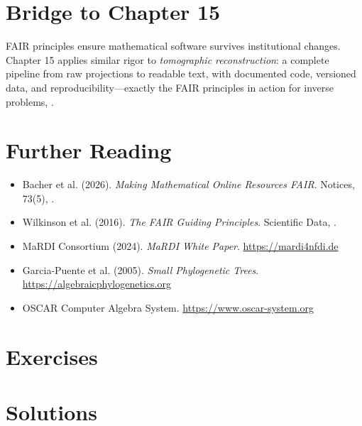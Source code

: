 \section{Bridge to Chapter 15}
\label{sec:fair:bridge}

FAIR principles ensure mathematical software survives institutional changes. Chapter 15 applies similar rigor to \emph{tomographic reconstruction}: a complete pipeline from raw projections to readable text, with documented code, versioned data, and reproducibility---exactly the FAIR principles in action for inverse problems, \cite{bacher2026fair}.

\section{Further Reading}
\label{sec:fair:refs}

\begin{itemize}
    \item Bacher et al. (2026). \textit{Making Mathematical Online Resources FAIR}. Notices, 73(5), \cite{bacher2026fair}.
    \item Wilkinson et al. (2016). \textit{The FAIR Guiding Principles}. Scientific Data, \cite{bacher2026fair}.
    \item MaRDI Consortium (2024). \textit{MaRDI White Paper}. \url{https://mardi4nfdi.de}
    \item Garcia-Puente et al. (2005). \textit{Small Phylogenetic Trees}. \url{https://algebraicphylogenetics.org}
    \item OSCAR Computer Algebra System. \url{https://www.oscar-system.org}
\end{itemize}

\section{Exercises}
\section{Solutions}
\label{sec:fair:solutions}

